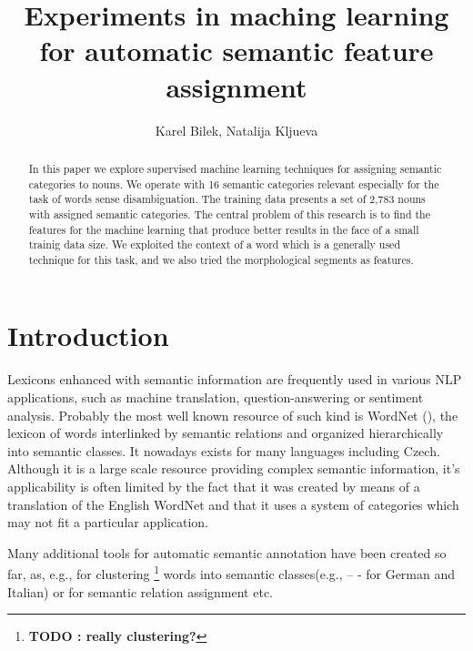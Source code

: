 \documentclass[letterpaper]{article}
\newcommand{\todofn}[1] {
 \footnote{\textbf{TODO : #1}}}
\begin{document}
%

\title{Experiments in maching learning for automatic semantic feature assignment}
\author{Karel Bilek, Natalija Kljueva}
\maketitle
\begin{abstract}
In this paper we explore supervised machine learning techniques for
assigning semantic categories to nouns. We operate with 16 semantic categories 
relevant especially for the task of words sense disambiguation. The training
data presents a set of 2,783 nouns with assigned semantic categories.   
The central problem of this research is to find the features for the machine learning 
that produce better results in the face of a small trainig data size. 
We exploited the context of a word which is a generally used technique for this task, 
and we also tried the morphological segments as features.

\end{abstract}


\section{Introduction}

Lexicons enhanced with semantic information are frequently used 
in various NLP applications, such as machine translation, question-answering
or sentiment analysis. Probably the most well known resource of such kind is 
WordNet (\cite{wordnet}), the lexicon of words
interlinked by semantic relations and organized hierarchically into 
semantic classes. It nowadays exists for many languages including Czech. Although it is a large scale resource providing complex semantic information, it's applicability is often limited by the fact that it was created by means of a translation of the English WordNet and that it uses a system of categories which may not fit a particular application.

Many additional tools for automatic semantic annotation have been created so far, as, e.g., 
for clustering\todofn{really clustering?} words into semantic classes(e.g., \cite{baroni:2009} -- - for German and Italian) or for 
semantic relation assignment \cite{peirsman} etc.  
 
\end{document}
